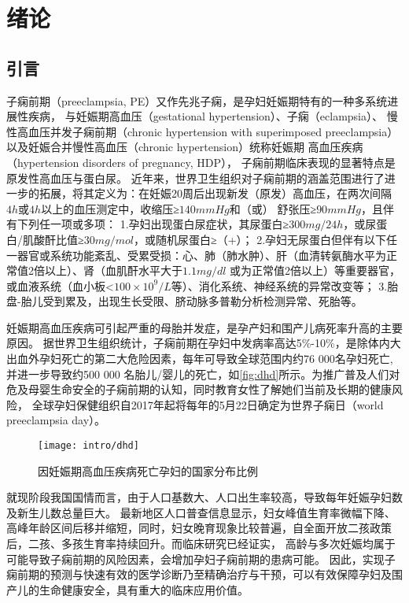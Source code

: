 \chapter{绪论}

\section{引言}
子痫前期（preeclampsia, PE）又作先兆子痫，是孕妇妊娠期特有的一种多系统进展性疾病， 与妊娠期高血压（gestational hypertension）、子痫（eclampsia）、
慢性高血压并发子痫前期（chronic hypertension with superimposed preeclampsia）以及妊娠合并慢性高血压（chronic hypertension）统称妊娠期
高血压疾病（hypertension disorders of pregnancy, HDP）\cite{OAG9,HDASOM,2000s1}，
子痫前期临床表现的显著特点是原发性高血压与蛋白尿。
近年来，世界卫生组织对子痫前期的涵盖范围进行了进一步的拓展，将其定义为：在妊娠20周后出现新发（原发）高血压，在两次间隔$4h$或$4h$以上的血压测定中，收缩压≥$140mmHg$和（或）
舒张压≥$90mmHg$，且伴有下列任一项或多项\cite{OAG9,FIGO}：
1.孕妇出现蛋白尿症状，其尿蛋白≥$300mg/24h$，或尿蛋白/肌酸酐比值≥$30mg/mol$，或随机尿蛋白≥（+）；
2.孕妇无尿蛋白但伴有以下任一器官或系统功能紊乱、受累受损：心、肺（肺水肿）、肝（血清转氨酶水平为正常值2倍以上）、肾（血肌酐水平大于$1.1mg/dl$
或为正常值2倍以上）等重要器官，或血液系统（血小板<$100 \times 10^{9}/L$等）、消化系统、神经系统的异常改变等；
3.胎盘-胎儿受到累及，出现生长受限、脐动脉多普勒分析检测异常、死胎等。

妊娠期高血压疾病可引起严重的母胎并发症，是孕产妇和围产儿病死率升高的主要原因\cite{OAG9}。
据世界卫生组织统计，子痫前期在孕妇中发病率高达5\%-10\%，是除体内大出血外孕妇死亡的第二大危险因素\cite{LCT2006}，每年可导致全球范围内约76 000名孕妇死亡,并进一步导致约500 000
名胎儿/婴儿的死亡\cite{DAM2015,LCT2006}，如\autoref{fig:dhd}所示。为推广普及人们对危及母婴生命安全的子痫前期的认知，同时教育女性了解她们当前及长期的健康风险，
全球孕妇保健组织自2017年起将每年的5月22日确定为世界子痫日（world preeclampsia day）。
\begin{figure}[htbp]
    \centering
    \texttt{[image: intro/dhd]}
    \caption[因妊娠期高血压疾病死亡孕妇的国家分布比例]{\label{fig:dhd}因妊娠期高血压疾病死亡孕妇的国家分布比例\cite{LCT2006}}
\end{figure}

就现阶段我国国情而言，由于人口基数大、人口出生率较高，导致每年妊娠孕妇数及新生儿数总量巨大\cite{nbs2022}。
最新地区人口普查信息显示\cite{zjtjj2022}，妇女峰值生育率微幅下降、高峰年龄区间后移并缩短，同时，妇女晚育现象比较普遍，自全面开放二孩政策后，二孩、多孩生育率持续回升。而临床研究已经证实，
高龄与多次妊娠均属于可能导致子痫前期的风险因素，会增加孕妇子痫前期的患病可能\cite{Duckitt2005,FIGO,Yogev2010,Poon2010,Lee2000,Coonrod1995,Robillard1993}。
因此，实现子痫前期的预测与快速有效的医学诊断乃至精确治疗与干预，可以有效保障孕妇及围产儿的生命健康安全，具有重大的临床应用价值。
